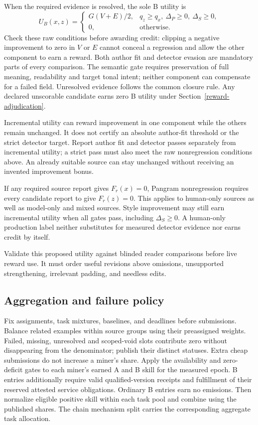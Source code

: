 When the required evidence is resolved, the sole B utility is
\begin{equation}\label{eq:transformation-utility}
 U_B(x,z)=\begin{cases}
 G(V+E)/2,&q_z\geq q_x,\ \Delta_P\geq0,\ \Delta_S\geq0,\\
 0,&\text{otherwise}.
 \end{cases}
\end{equation}
Check these raw conditions before awarding credit: clipping a negative
improvement to zero in \(V\) or \(E\) cannot conceal a regression and
allow the other component to earn a reward. Both author fit and detector
evasion are mandatory parts of every comparison. The semantic gate
requires preservation of full meaning, readability and target tonal intent;
neither component can compensate for a failed field. Unresolved evidence
follows the common closure rule. Any declared unscorable candidate earns
zero B utility under Section~\ref{reward-adjudication}.

Incremental utility can reward improvement in one component while the
others remain unchanged. It does not certify an absolute author-fit
threshold or the strict detector target. Report author fit and detector
passes separately from incremental utility; a strict pass must also meet
the raw nonregression conditions above. An already suitable source can
stay unchanged without receiving an invented improvement bonus.

If any required source report gives \(F_r(x)=0\), Pangram nonregression
requires every candidate report to give \(F_r(z)=0\). This applies to
human-only sources as well as model-only and mixed sources. Style
improvement may still earn incremental utility when all gates pass,
including \(\Delta_S\geq0\). A human-only production label neither
substitutes for measured detector evidence nor earns credit by itself.

Validate this proposed utility against blinded reader comparisons
before live reward use. It must order useful revisions above omissions,
unsupported strengthening, irrelevant padding, and needless edits.

\subsection{Aggregation and failure
policy}\label{aggregation-and-failure-policy}

Fix assignments, task mixtures, baselines, and deadlines before
submissions. Balance related examples within source groups using their
preassigned weights. Failed, missing, unresolved and scoped-void slots
contribute zero without disappearing from the denominator; publish their
distinct statuses. Extra cheap submissions do not increase a miner's share. Apply the availability and
zero-deficit gates to each miner's earned A and B skill for the measured
epoch. B entries additionally require valid qualified-version receipts
and fulfillment of their reserved attested service obligations. Ordinary
B entries earn no emissions. Then normalize eligible positive skill
within each task pool and combine using the published shares. The chain mechanism split carries the corresponding
aggregate task allocation.

